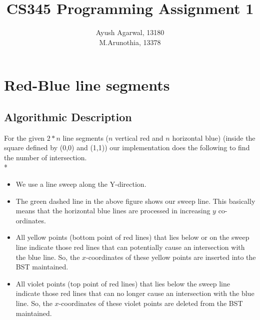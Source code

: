 \documentclass{article}
\title{CS345 Programming Assignment 1 \\ }
\author{\vspace{2mm} \large Ayush Agarwal, 13180 \\ M.Arunothia, 13378}
\date{}
\begin{document}
\maketitle
\section{Red-Blue line segments}
\subsection{Algorithmic Description}
For the given $2*n$ line segments ($n$ vertical red and $n$ horizontal blue) (inside the square defined by (0,0) and (1,1))  our implementation does the following to find the number of intersection. \\*
\begin{itemize}
\item We use a line sweep along the Y-direction.
\begin{center}
\end{center}
\item The green dashed line in the above figure shows our sweep line. This basically means that the horizontal blue lines are processed in increasing $y$ co-ordinates.
\item All yellow points (bottom point of red lines) that lies below or on the sweep line indicate those red lines that can potentially cause an intersection with the blue line. So, the $x$-coordinates of these yellow points are inserted into the BST maintained.
\item All violet points (top point of red lines) that lies below the sweep line indicate those red lines that can no longer cause an intersection with the blue line. So, the $x$-coordinates of these violet points are deleted from the BST maintained.

\end{itemize}
\end{document}
